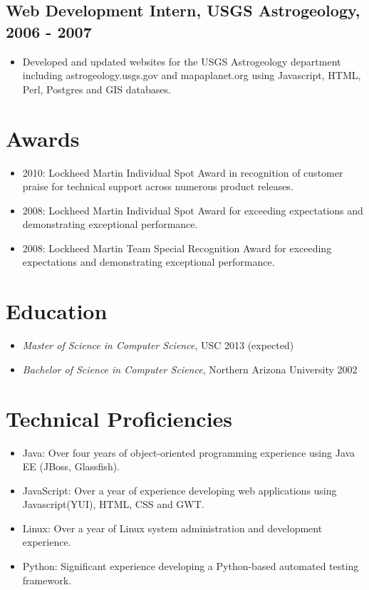 \documentclass[11pt]{article}
\begin{document}
\subsection*{Web Development Intern, USGS Astrogeology, 2006 - 2007}
\label{sec-1.2}

\begin{itemize}
\item Developed and updated websites for the USGS Astrogeology department including astrogeology.usgs.gov and mapaplanet.org using Javascript, HTML, Perl, Postgres and GIS databases.
\end{itemize}
\section*{Awards}
\label{sec-2}

\begin{itemize}
\item 2010: Lockheed Martin Individual Spot Award in recognition of customer praise for technical support across numerous product releases.
\item 2008: Lockheed Martin Individual Spot Award for exceeding expectations and demonstrating exceptional performance.
\item 2008: Lockheed Martin Team Special Recognition Award for exceeding expectations and demonstrating exceptional performance.
\end{itemize}
\section*{Education}
\label{sec-3}

\begin{itemize}
\item \emph{Master of Science in Computer Science}, USC 2013 (expected)
\item \emph{Bachelor of Science in Computer Science}, Northern Arizona University 2002
\end{itemize}
\section*{Technical Proficiencies}
\label{sec-4}

\begin{itemize}
\item Java: Over four years of object-oriented programming experience using Java EE (JBoss, Glassfish).
\item JavaScript: Over a year of experience developing web applications using Javascript(YUI), HTML, CSS and GWT.
\item Linux: Over a year of Linux system administration and development experience.
\item Python: Significant experience developing a Python-based automated testing framework.
\end{itemize}
\end{document}
